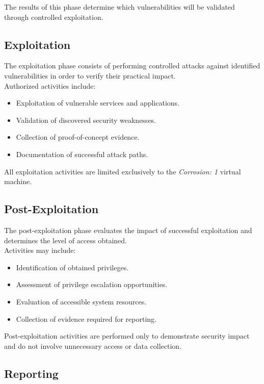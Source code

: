 The results of this phase determine which vulnerabilities will be validated
through controlled exploitation.

\subsection{Exploitation}

The exploitation phase consists of performing controlled attacks against
identified vulnerabilities in order to verify their practical impact.
\\

Authorized activities include:

\begin{itemize}
    \item Exploitation of vulnerable services and applications.
    \item Validation of discovered security weaknesses.
    \item Collection of proof-of-concept evidence.
    \item Documentation of successful attack paths.
\end{itemize}

All exploitation activities are limited exclusively to the \textit{Corrosion: 1}
virtual machine.

\subsection{Post-Exploitation}

The post-exploitation phase evaluates the impact of successful exploitation and
determines the level of access obtained.
\\

Activities may include:

\begin{itemize}
    \item Identification of obtained privileges.
    \item Assessment of privilege escalation opportunities.
    \item Evaluation of accessible system resources.
    \item Collection of evidence required for reporting.
\end{itemize}

Post-exploitation activities are performed only to demonstrate security impact
and do not involve unnecessary access or data collection.

\subsection{Reporting}


